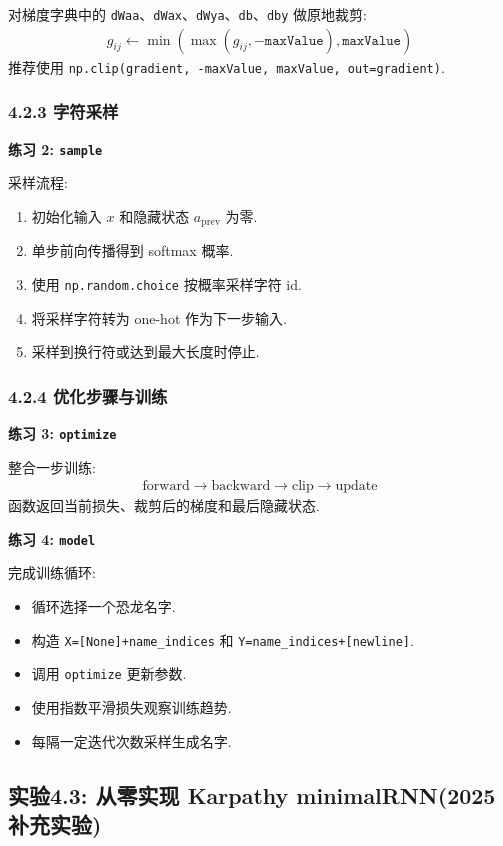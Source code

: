 \documentclass{../../nndlcourse}
\begin{document}
对梯度字典中的 \texttt{dWaa}、\texttt{dWax}、\texttt{dWya}、\texttt{db}、\texttt{dby} 做原地裁剪:
\begin{align}
    g_{ij}\leftarrow \min(\max(g_{ij},-\texttt{maxValue}),\texttt{maxValue})
\end{align}
推荐使用 \texttt{np.clip(gradient, -maxValue, maxValue, out=gradient)}.

\subsubsection*{4.2.3 字符采样}

\textbf{练习 2: \texttt{sample}}

采样流程:
\begin{enumerate}
    \item 初始化输入 $x$ 和隐藏状态 $a_{\mathrm{prev}}$ 为零.
    \item 单步前向传播得到 softmax 概率.
    \item 使用 \texttt{np.random.choice} 按概率采样字符 id.
    \item 将采样字符转为 one-hot 作为下一步输入.
    \item 采样到换行符或达到最大长度时停止.
\end{enumerate}

\subsubsection*{4.2.4 优化步骤与训练}

\textbf{练习 3: \texttt{optimize}}

整合一步训练:
\begin{align}
    \text{forward}\to \text{backward}\to \text{clip}\to \text{update}
\end{align}
函数返回当前损失、裁剪后的梯度和最后隐藏状态.

\textbf{练习 4: \texttt{model}}

完成训练循环:
\begin{itemize}
    \item 循环选择一个恐龙名字.
    \item 构造 \texttt{X=[None]+name\_indices} 和 \texttt{Y=name\_indices+[newline]}.
    \item 调用 \texttt{optimize} 更新参数.
    \item 使用指数平滑损失观察训练趋势.
    \item 每隔一定迭代次数采样生成名字.
\end{itemize}

\subsection*{实验4.3: 从零实现 Karpathy minimalRNN(2025 补充实验)}
\end{document}

